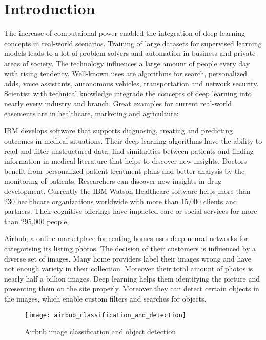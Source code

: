 \chapter{Introduction}

The increase of computaional power enabled the integration of deep learning concepts in real-world scenarios.
Training of large datasets for supervised learning models leads to a lot of problem solvers and automation in business and private areas of society.
The technology influences a large amount of people every day with rising tendency.
Well-known uses are algorithms for search, personalized adds, voice assistants, autonomous vehicles, transportation and network security.
\hfill \break
Scientist with technical knowledge integrade the concepts of deep learning into nearly every industry and branch.
Great examples for current real-world easements are in healthcare, marketing and agriculture:

IBM develops software that supports diagnosing, treating and predicting outcomes in medical situations.
Their deep learning algorithms have the ability to read and filter unstructured data, find similarities between patients and finding information in medical literature that helps to discover new insights.
Doctors benefit from personalized patient treatment plans and better analysis by the monitoring of patients. Researchers can discover new insights in drug development.
Currently the IBM Watson Healthcare software helps more than 230 healthcare organizations worldwide with more than 15,000 clients and partners. Their cognitive offerings have impacted care or social services for more than 295,000 people.
\cite{ibm-watson-healthcare, ibm-watson-facts}

Airbnb, a online marketplace for renting homes uses deep neural networks for categorising its listing photos.
The decision of their customers is influenced by a diverse set of images.
Many home providers label their images wrong and have not enough variety in their collection.
Moreover their total amount of photos is nearly half a billion images.
Deep learning helps them identifying the picture and presenting them on the site properly.
Moreover they can detect certain objects in the images, which enable custom filters and searches for objects.
\cite{airbnb-ic-video, airbnb-ic-blog}

\begin{figure}[H]
    \centering
    \texttt{[image: airbnb\_classification\_and\_detection]}
    \caption{\cite{airbnb_image_classification, airbnb_object_detection} Airbnb image classification and object detection}
    \label{fig:airbnb_image_classification}
\end{figure}


